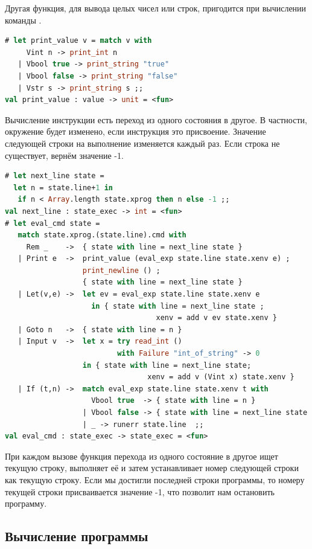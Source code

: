 Другая функция, для вывода целых чисел или строк, пригодится при вычислении 
команды .

\begin{lstlisting}[language=OCaml]
# let print_value v = match v with 
     Vint n -> print_int n
   | Vbool true -> print_string "true"
   | Vbool false -> print_string "false"
   | Vstr s -> print_string s ;;
val print_value : value -> unit = <fun>
\end{lstlisting}

Вычисление инструкции есть переход из одного состояния в другое. В частности, 
окружение будет изменено, если инструкция это присвоение. Значение следующей 
строки на выполнение изменяется каждый раз. Если строка не существует, вернём 
значение -1.

\begin{lstlisting}[language=OCaml]
# let next_line state =
  let n = state.line+1 in
   if n < Array.length state.xprog then n else -1 ;;
val next_line : state_exec -> int = <fun>
# let eval_cmd state =
   match state.xprog.(state.line).cmd with 
     Rem _    ->  { state with line = next_line state }
   | Print e  ->  print_value (eval_exp state.line state.xenv e) ; 
                  print_newline () ;
                  { state with line = next_line state }
   | Let(v,e) ->  let ev = eval_exp state.line state.xenv e 
                    in { state with line = next_line state ; 
                                   xenv = add v ev state.xenv }
   | Goto n   ->  { state with line = n }
   | Input v  ->  let x = try read_int () 
                          with Failure "int_of_string" -> 0
                  in { state with line = next_line state; 
                                 xenv = add v (Vint x) state.xenv }
   | If (t,n) ->  match eval_exp state.line state.xenv t with 
                    Vbool true  -> { state with line = n }
                  | Vbool false -> { state with line = next_line state }
                  | _ -> runerr state.line  ;;
val eval_cmd : state_exec -> state_exec = <fun>
\end{lstlisting}

При каждом вызове функция перехода из одного состояние в другое 
 ищет текущую строку, выполняет её и затем устанавливает номер 
следующей строки как текущую строку. Если мы достигли последней строки 
программы, то номеру текущей строки присваивается значение -1, что позволит нам 
остановить программу.

\subsection{Вычисление программы}
\label{subsubsec:program_evaluation}

